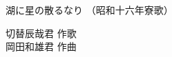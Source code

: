 \documentclass[10pt,b5j]{tarticle} %
\begin{document}
\begin{minipage}[c]{0.7\hsize} %
    \begin{center}
        {\LARGE
            湖に星の散るなり %
        }
        {\small 
            （昭和十六年寮歌） %
        }
    \end{center}
\end{minipage}
\begin{minipage}[c]{0.3\hsize} %
    \begin{flushright} %
        切替辰哉君 作歌\\岡田和雄君 作曲 %
    \end{flushright}
\end{minipage}
\end{document}
